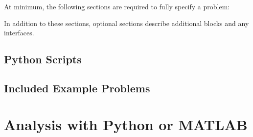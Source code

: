 \documentclass[12pt]{article}   	%
\begin{document}
At minimum, the following sections are required to fully specify a problem:

\vspace{0.1in}

\vspace{0.1in}
In addition to these sections, optional sections describe additional blocks and any interfaces.

\subsection{Python Scripts}

\subsection{Included Example Problems}

\section{Analysis with Python or MATLAB}
\end{document}
